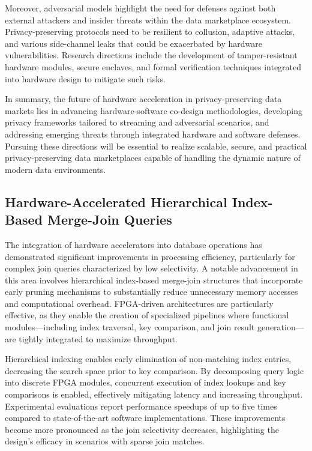 \documentclass[sigconf]{acmart}
\begin{document}
Moreover, adversarial models highlight the need for defenses against both external attackers and insider threats within the data marketplace ecosystem. Privacy-preserving protocols need to be resilient to collusion, adaptive attacks, and various side-channel leaks that could be exacerbated by hardware vulnerabilities. Research directions include the development of tamper-resistant hardware modules, secure enclaves, and formal verification techniques integrated into hardware design to mitigate such risks.

In summary, the future of hardware acceleration in privacy-preserving data markets lies in advancing hardware-software co-design methodologies, developing privacy frameworks tailored to streaming and adversarial scenarios, and addressing emerging threats through integrated hardware and software defenses. Pursuing these directions will be essential to realize scalable, secure, and practical privacy-preserving data marketplaces capable of handling the dynamic nature of modern data environments.

\subsection{Hardware-Accelerated Hierarchical Index-Based Merge-Join Queries}

The integration of hardware accelerators into database operations has demonstrated significant improvements in processing efficiency, particularly for complex join queries characterized by low selectivity. A notable advancement in this area involves hierarchical index-based merge-join structures that incorporate early pruning mechanisms to substantially reduce unnecessary memory accesses and computational overhead. FPGA-driven architectures are particularly effective, as they enable the creation of specialized pipelines where functional modules—including index traversal, key comparison, and join result generation—are tightly integrated to maximize throughput.

Hierarchical indexing enables early elimination of non-matching index entries, decreasing the search space prior to key comparison. By decomposing query logic into discrete FPGA modules, concurrent execution of index lookups and key comparisons is enabled, effectively mitigating latency and increasing throughput. Experimental evaluations report performance speedups of up to five times compared to state-of-the-art software implementations. These improvements become more pronounced as the join selectivity decreases, highlighting the design’s efficacy in scenarios with sparse join matches.
\end{document}
